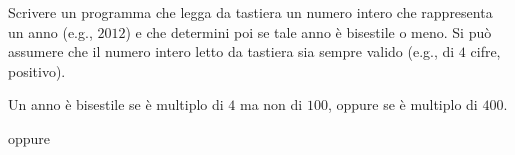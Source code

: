 \begin{Exercise}[label={ex:bisestile}]
  Scrivere un programma che legga da tastiera un numero intero che rappresenta un anno (e.g., $2012$) e che determini poi se tale anno \`e bisestile o meno. Si pu\`o assumere che il numero intero letto da tastiera sia sempre valido (e.g., di $4$ cifre, positivo).

  Un anno \`e bisestile se \`e multiplo di $4$ ma non di $100$, oppure se \`e multiplo di $400$.
\end{Exercise}

\begin{Answer}[ref={ex:bisestile}]
    
    oppure
       
\end{Answer}